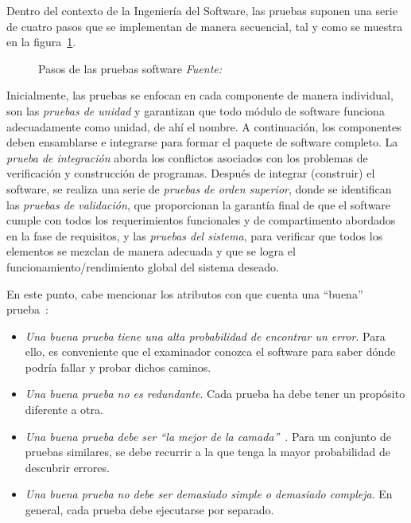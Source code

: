 Dentro del contexto de la Ingeniería del Software, las pruebas suponen una serie de cuatro pasos que se implementan de manera secuencial, tal y como se muestra en la figura~\ref{fig:estrategiaPruebas}. 

\begin{figure}
	\centering
	\caption[Pasos de las pruebas software]{Pasos de las pruebas software \textit{Fuente:~\cite{Pre10}}}
	\label{fig:estrategiaPruebas}
\end{figure}

Inicialmente, las pruebas se enfocan en cada componente de manera individual, son las \emph{pruebas de unidad} y garantizan que todo módulo de software funciona adecuadamente como unidad, de ahí el nombre. A continuación, los componentes deben ensamblarse e integrarse para formar el paquete de software completo. La \emph{prueba de integración} aborda los conflictos asociados con los problemas de verificación y construcción de programas. Después de integrar (construir) el software, se realiza una serie de \emph{pruebas de orden superior}, donde se identifican las \emph{pruebas de validación}, que proporcionan la garantía final de que el software cumple con todos los requerimientos funcionales y de compartimento abordados en la fase de requisitos, y las \emph{pruebas del sistema}, para verificar que todos los elementos se mezclan de manera adecuada y que se logra el funcionamiento/rendimiento global del sistema deseado.

En este punto, cabe mencionar los atributos con que cuenta una ``buena'' prueba~\cite{Kan99}:

\begin{itemize}
	\item \textit{Una buena prueba tiene una alta probabilidad de encontrar un error}. Para ello, es conveniente que el examinador conozca el software para saber dónde podría fallar y probar dichos caminos.
	\item \textit{Una buena prueba no es redundante}. Cada prueba ha debe tener un propósito diferente a otra.
	\item \textit{Una buena prueba debe ser ``la mejor de la camada''}~\cite{Kan99}. Para un conjunto de pruebas similares, se debe recurrir a la que tenga la mayor probabilidad de descubrir errores.
	\item \textit{Una buena prueba no debe ser demasiado simple o demasiado compleja}. En general, cada prueba debe ejecutarse por separado.
\end{itemize}

